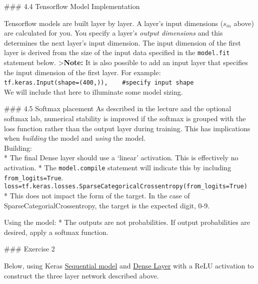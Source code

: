 \documentclass[11pt]{article}
\begin{document}
    \#\#\# 4.4 Tensorflow Model Implementation

    Tensorflow models are built layer by layer. A layer's input dimensions
(\(s_{in}\) above) are calculated for you. You specify a layer's
\emph{output dimensions} and this determines the next layer's input
dimension. The input dimension of the first layer is derived from the
size of the input data specified in the \texttt{model.fit} statement
below. \textgreater{}\textbf{Note:} It is also possible to add an input
layer that specifies the input dimension of the first layer. For
example:\\
\texttt{tf.keras.Input(shape=(400,)),\ \ \ \ \#specify\ input\ shape}~\\
We will include that here to illuminate some model sizing.

    \#\#\# 4.5 Softmax placement As described in the lecture and the
optional softmax lab, numerical stability is improved if the softmax is
grouped with the loss function rather than the output layer during
training. This has implications when \emph{building} the model and
\emph{using} the model.\\
Building:\\
* The final Dense layer should use a `linear' activation. This is
effectively no activation. * The \texttt{model.compile} statement will
indicate this by including \texttt{from\_logits=True}.
\texttt{loss=tf.keras.losses.SparseCategoricalCrossentropy(from\_logits=True)}\\
* This does not impact the form of the target. In the case of
SparseCategorialCrossentropy, the target is the expected digit, 0-9.

Using the model: * The outputs are not probabilities. If output
probabilities are desired, apply a softmax function.

    \#\#\# Exercise 2

Below, using Keras
\href{https://keras.io/guides/sequential_model/}{Sequential model} and
\href{https://keras.io/api/layers/core_layers/dense/}{Dense Layer} with
a ReLU activation to construct the three layer network described above.
\end{document}
